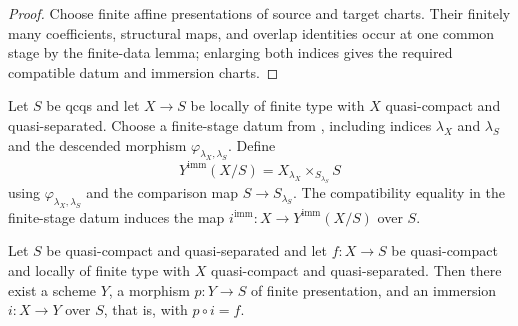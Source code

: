 \begin{proof}
  Choose finite affine presentations of source and target charts. Their
  finitely many coefficients, structural maps, and overlap identities occur
  at one common stage by the finite-data lemma; enlarging both indices gives
  the required compatible datum and immersion charts.
\end{proof}

\begin{definition}
  \label{def:nagata-immersion-into-fp-model}

  Let $S$ be qcqs and let $X\to S$ be locally of finite type with $X$
  quasi-compact and quasi-separated.  Choose a finite-stage datum from
  , including indices
  $\lambda_X$ and $\lambda_S$ and the descended morphism
  $\varphi_{\lambda_X,\lambda_S}$.  Define
  \[
    Y^{\mathrm{imm}}(X/S)
      =X_{\lambda_X}\times_{S_{\lambda_S}}S
  \]
  using $\varphi_{\lambda_X,\lambda_S}$ and the comparison map
  $S\to S_{\lambda_S}$.  The compatibility equality in the finite-stage
  datum induces the map $i^{\mathrm{imm}}\colon X\to Y^{\mathrm{imm}}(X/S)$
  over $S$.
\end{definition}

\begin{lemma}
  \label{lemma:nagata-immersion-into-fp-model}
  \leanok

  Let $S$ be quasi-compact and quasi-separated and let $f\colon X\to S$ be
  quasi-compact and locally of finite type with $X$ quasi-compact and
  quasi-separated.  Then there exist a scheme $Y$, a morphism $p\colon Y\to S$
  of finite presentation, and an immersion $i\colon X\to Y$ over $S$, that is,
  with $p\circ i=f$.
\end{lemma}

